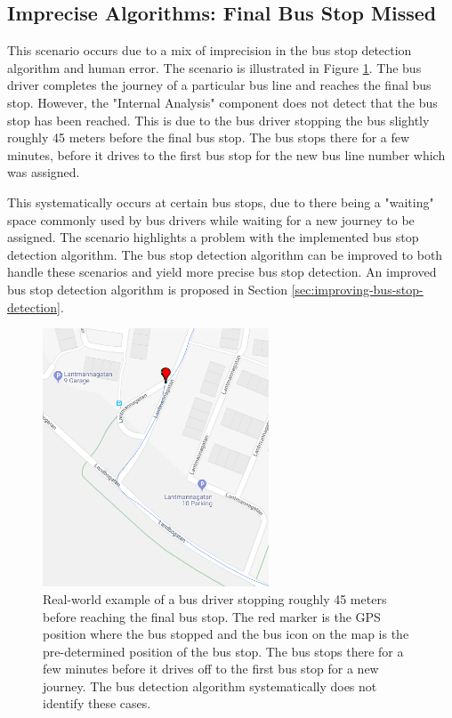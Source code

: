 \subsection{Imprecise Algorithms: Final Bus Stop Missed}
This scenario occurs due to a mix of imprecision in the bus stop detection algorithm and human error.
The scenario is illustrated in Figure \ref{fig:stopped-before-end}.
The bus driver completes the journey of a particular bus line and reaches the final bus stop.
However, the "Internal Analysis" component does not detect that the bus stop has been reached.
This is due to the bus driver stopping the bus slightly roughly 45 meters before the final bus stop.
The bus stops there for a few minutes, before it drives to the first bus stop for the new bus line number which was assigned.

This systematically occurs at certain bus stops, due to there being a "waiting" space commonly used by bus drivers while waiting for a new journey to be assigned.
The scenario highlights a problem with the implemented bus stop detection algorithm.
The bus stop detection algorithm can be improved to both handle these scenarios and yield more precise bus stop detection.
An improved bus stop detection algorithm is proposed in Section \ref{sec:improving-bus-stop-detection}.

\begin{figure}[t!]
    \centering
    \includegraphics[width=0.6\textwidth]{figures/stopped_before_end}
    \caption{Real-world example of a bus driver stopping roughly 45 meters before reaching the final bus stop.
    The red marker is the GPS position where the bus stopped and the bus icon on the map is the pre-determined position of the bus stop.
    The bus stops there for a few minutes before it drives off to the first bus stop for a new journey.
    The bus detection algorithm systematically does not identify these cases.}
    \label{fig:stopped-before-end}
\end{figure}


